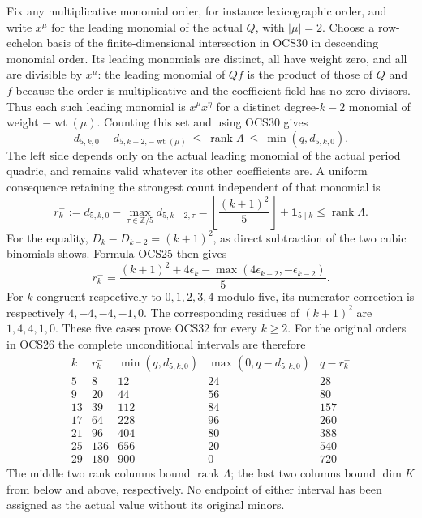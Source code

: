 \documentclass[11pt,a4paper]{article}
\begin{document}
Fix any multiplicative monomial order, for instance
lexicographic order, and write $x^\mu$ for the leading
monomial of the actual $Q$, with $|\mu|=2$. Choose a
row-echelon basis of the finite-dimensional intersection
in OCS30 in descending monomial order. Its leading
monomials are distinct, all have weight zero, and all
are divisible by $x^\mu$: the leading monomial of
$Qf$ is the product of those of $Q$ and $f$ because
the order is multiplicative and the coefficient field
has no zero divisors. Thus each such leading monomial
is $x^\mu x^\eta$ for a distinct degree-$k-2$ monomial
of weight $-\operatorname{wt}(\mu)$. Counting this set
and using OCS30 gives
\[
 \boxed{\quad
 d_{5,k,0}-d_{5,k-2,-\operatorname{wt}(\mu)}
 \ \leq\ \operatorname{rank}\Lambda
 \ \leq\ \min(q,d_{5,k,0}).\quad}
 \tag{OCS31}
\]
The left side depends only on the actual leading monomial
of the actual period quadric, and remains valid whatever
its other coefficients are. A uniform consequence retaining
the strongest count independent of that monomial is
\[
 r_k^-:=d_{5,k,0}-\max_{\tau\in\mathbb Z/5}d_{5,k-2,\tau}
       =\left\lfloor\frac{(k+1)^2}{5}\right\rfloor
                                  +\mathbf1_{5\mid k}
       \leq\operatorname{rank}\Lambda.
 \tag{OCS32}
\]
For the equality, $D_k-D_{k-2}=(k+1)^2$, as direct
subtraction of the two cubic binomials shows. Formula
OCS25 then gives
\[
 r_k^-=\frac{(k+1)^2+4\epsilon_k
                   -\max(4\epsilon_{k-2},-\epsilon_{k-2})}{5}.
\]
For $k$ congruent respectively to $0,1,2,3,4$ modulo five,
its numerator correction is respectively $4,-4,-4,-1,0$.
The corresponding residues of $(k+1)^2$ are $1,4,4,1,0$.
These five cases prove OCS32 for every $k\geq2$.
For the original orders in OCS26 the complete unconditional
intervals are therefore
\[
\begin{array}{c|r|r|r|r}
 k&r_k^-&\min(q,d_{5,k,0})&\max(0,q-d_{5,k,0})&q-r_k^-\\\hline
 5&8&12&24&28\\
 9&20&44&56&80\\
 13&39&112&84&157\\
 17&64&228&96&260\\
 21&96&404&80&388\\
 25&136&656&20&540\\
 29&180&900&0&720
\end{array}\tag{OCS33}
\]
The middle two rank columns bound $\operatorname{rank}\Lambda$;
the last two columns bound $\dim K$ from below and above,
respectively. No endpoint of either interval has been assigned
as the actual value without its original minors.
\end{document}
